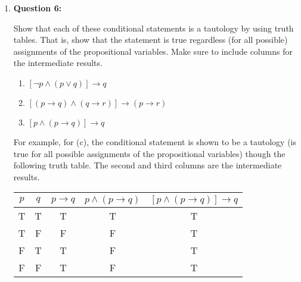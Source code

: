 \documentclass[11pt]{article}
\begin{document}
\begin{enumerate}
\item
\textbf{Question 6:}

Show that each of these conditional statements is a tautology by using truth tables. That is, show that the statement is true regardless (for all possible) assignments of the propositional variables. Make sure to include columns for the intermediate results.

\begin{enumerate}[label=(\alph*)]
\item $[\lnot p \land (p \lor q)] \rightarrow q$
\item $[(p \rightarrow q) \land (q \rightarrow r)] \rightarrow (p \rightarrow r)$
\item $[p \land (p \rightarrow q)] \rightarrow q$
\end{enumerate}

For example, for (c), the conditional statement is shown to be a tautology (is true for all possible assignments of the propositional variables) though the following truth table. The second and third columns are the intermediate results.

\begin{center}
\begin{tabular}{|c|c|c|c|c|}
\hline
$p$ & $q$ & $p \rightarrow q$ & $p \land (p \rightarrow q)$ & $[p \land (p \rightarrow q)] \rightarrow q$\\
\hline
T & T & T & T & T\\
T & F & F & F & T\\
F & T & T & F & T\\
F & F & T & F & T\\
\hline
\end{tabular}
\end{center}

\end{enumerate}
\end{document}
